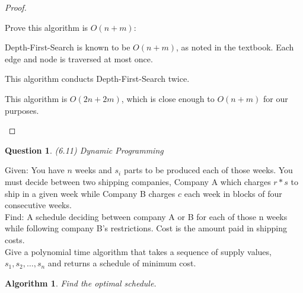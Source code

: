 \documentclass[11pt, oneside]{article}   	%
\newtheorem{Question}{Question}
\newtheorem{Algorithm}{Algorithm}
\begin{document}
\begin{proof}
\begin{description}
Prove this algorithm is $O(n+m)$:

 Depth-First-Search is known to be $O(n+m)$, as noted in the textbook. Each edge and node is traversed at most once.

This algorithm conducts Depth-First-Search twice.

This algorithm is $O(2n+2m)$, which is close enough to $O(n+m)$ for our purposes.

\end{description}
\end{proof}

\newpage

\begin{Question} (6.11) Dynamic Programming
\end{Question}
\noindent Given: You have $n$ weeks and $s_i$ parts to be produced each of those weeks. You must decide between two shipping companies, Company A which charges $r * s$ to ship in a given week while Company B charges $c$ each week in blocks of four consecutive weeks.\\

\noindent Find: A schedule deciding between company A or B for each of those n weeks while following company B's restrictions. Cost is the amount paid in shipping costs. \\

\noindent Give a polynomial time algorithm that takes a sequence of supply values, $s_1, s_2, \ldots , s_n$ and returns a schedule of minimum cost.

\begin{Algorithm}
Find the optimal schedule.
\end{Algorithm}
\end{document}
